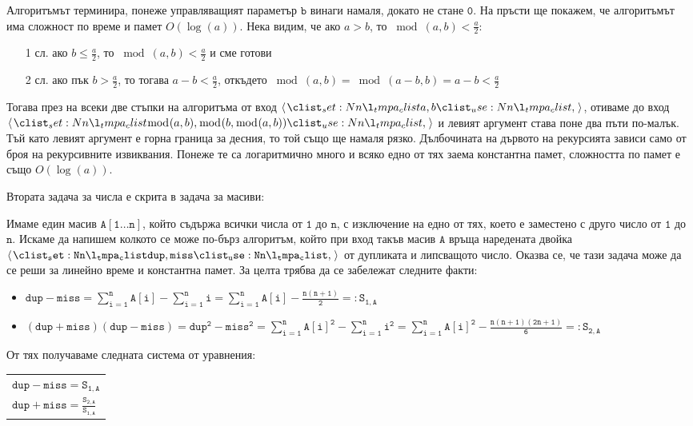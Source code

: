 \documentclass{article}
\theoremstyle{definition}
\theoremstyle{plain}
\theoremstyle{remark}
\theoremstyle{definition}
\begin{document}
Алгоритъмът терминира, понеже управляващият параметър $\mathtt{b}$ винаги намаля, докато не стане $\mathtt{0}$.
На пръсти ще покажем, че алгоритъмът има сложност по време и памет $O(\log(a))$.
Нека видим, че ако $a > b$, то $\bmod(a, b) < \frac{a}{2}$:
\begin{itemize}
  \item[1 сл.] ако $b \leq \frac{a}{2}$, то $\bmod(a, b) < \frac{a}{2}$ и сме готови
  \item[2 сл.] ако пък $b > \frac{a}{2}$, то тогава $a - b < \frac{a}{2}$, откъдето $\bmod(a, b) = \bmod(a - b, b) = a - b < \frac{a}{2}$
\end{itemize}
Тогава през на всеки две стъпки на алгоритъма от вход $\opair{a, b}$, отиваме до вход $\opair{\bmod(a, b), \bmod(b, \bmod(a, b))}$ и левият аргумент става поне два пъти по-малък.
Тъй като левият аргумент е горна граница за десния, то той също ще намаля рязко.
Дълбочината на дървото на рекурсията зависи само от броя на рекурсивните извиквания.
Понеже те са логаритмично много и всяко едно от тях заема константна памет, сложността по памет е също $O(\log(a))$.

Втората задача за числа е скрита в задача за масиви:

Имаме един масив $\mathtt{A[1 \dots n]}$, който съдържа всички числа от $\mathtt{1}$ до $\mathtt{n}$, с изключение на едно от тях, което е заместено с друго число от $\mathtt{1}$ до $\mathtt{n}$.
Искаме да напишем колкото се може по-бърз алгоритъм, който при вход такъв масив $\mathtt{A}$ връща наредената двойка $\mathtt{\opair{dup, miss}}$ от дупликата и липсващото число.
Оказва се, че тази задача може да се реши за линейно време и константна памет.
За целта трябва да се забележат следните факти:
\begin{itemize}
  \item $\mathtt{dup - miss = \sum\limits_{i = 1}^n A[i] - \sum\limits_{i = 1}^n i = \sum\limits_{i = 1}^n A[i] - \frac{n(n + 1)}{2} =: S_{1, A}}$
  \item $\mathtt{(dup + miss)(dup - miss) = dup^2 - miss^2 = \sum\limits_{i = 1}^n A[i]^2 - \sum\limits_{i = 1}^n i^2 = \sum\limits_{i = 1}^n A[i]^2 - \frac{n(n + 1)(2n + 1)}{6} =: S_{2, A}}$
\end{itemize}

\pagebreak

От тях получаваме следната система от уравнения:
\begin{center}
  \begin{tabular}{|l}
    $\mathtt{dup - miss = S_{1, A}}$ \\
    $\mathtt{dup + miss = \frac{S_{2, A}}{S_{1, A}}}$
  \end{tabular}
\end{center}
\end{document}
